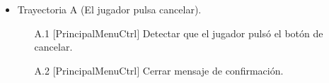 \begin{itemize}
	\item Trayectoria A (El jugador pulsa cancelar).
			\begin{enumerate}
				\item[{A.}1] $\lbrack$PrincipalMenuCtrl$\rbrack$ Detectar que el jugador pulsó el 
				botón de cancelar.
				\item[{A.}2] $\lbrack$PrincipalMenuCtrl$\rbrack$ Cerrar mensaje de confirmación.
			\end{enumerate}
	\end{itemize}	